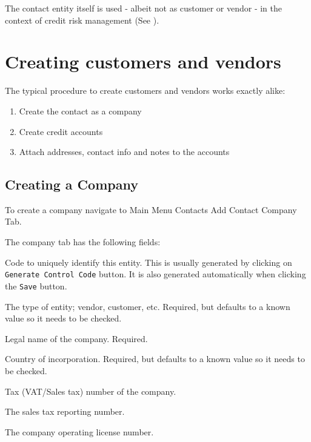 The contact entity itself is used - albeit not as customer or vendor - in the context of
credit risk management (See ).

\section{Creating customers and vendors}
\label{sec-business-processes-creating-customers-and-vendors}

The typical procedure to create customers and vendors works exactly alike:

\begin{enumerate}
\item Create the \gls{contact} as a company
\item Create \glspl{credit account}
\item Attach addresses, contact info and notes to the accounts
\end{enumerate}

\subsection{Creating a Company}
\label{subsec-business-processes-customer-creating-company}

To create a company navigate to Main Menu \ma Contacts \ma Add Contact \ma Company Tab.

The company tab has the following fields:

\begin{description}[style=nextline]
\item [Control code] Code to uniquely identify this entity.  This is usually generated by clicking on \texttt{Generate Control Code} button.  It is also generated automatically when clicking the \texttt{Save} button.
\item [Class] The type of entity; \gls{vendor}, \gls{customer}, etc. Required, but defaults to a known value so it needs to be checked.
\item [Name] Legal name of the company. Required.
\item [Country] Country of incorporation. Required, but defaults to a known value so it needs to be checked.
\item [Tax number/SSN] Tax (VAT/Sales tax) number of the company.
\item [Sales Tax ID] The sales tax reporting number.
\item [License Number] The company operating license number.
\end{description}

